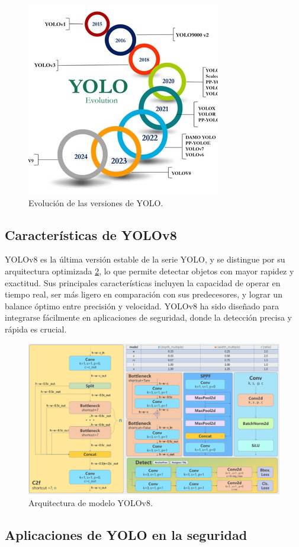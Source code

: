 \begin{figure}[!ht]
  \centering
  \includegraphics[width=.49\linewidth]{images/yolo_evolution.jpg}
  \caption{Evolución de las versiones de YOLO.}
  \label{fig:yolo_evolution}
\end{figure}

\subsection{Características de YOLOv8}

YOLOv8 es la última versión estable de la serie YOLO, y se distingue por su arquitectura optimizada \ref{fig:yolo_architecture}, lo que permite detectar objetos con mayor rapidez y exactitud. Sus principales características incluyen la capacidad de operar en tiempo real, ser más ligero en comparación con sus predecesores, y lograr un balance óptimo entre precisión y velocidad. YOLOv8 ha sido diseñado para integrarse fácilmente en aplicaciones de seguridad, donde la detección precisa y rápida es crucial.

\begin{figure}[!ht]
  \centering
  \includegraphics[width=.49\linewidth]{images/yolo_architecture.png}
  \caption{Arquitectura de modelo YOLOv8.}
  \label{fig:yolo_architecture}
\end{figure}

\subsection{Aplicaciones de YOLO en la seguridad}

